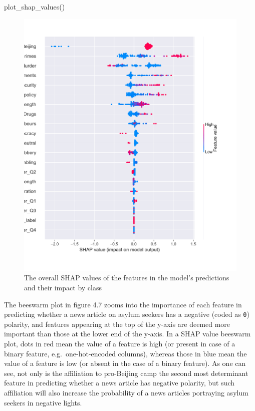 \documentclass[a4paper, oneside]{report}
\newenvironment{Shaded}{\begin{snugshade}}{\end{snugshade}}
\newcommand{\NormalTok}[1]{#1}
\renewenvironment{Shaded}
{
  \vspace{4pt}%
  \begin{snugshade}%
}{%
  \end{snugshade}%
  \vspace{4pt}%
}
\begin{document}
\begin{Shaded}
\begin{Highlighting}[]
\NormalTok{plot\_shap\_values()}
\end{Highlighting}
\end{Shaded}

\begin{figure}
\centering
\includegraphics{versions/Chin_Chapter_4_2022-01-10_files/figure-latex/unnamed-chunk-13-1.pdf}
\caption{The overall SHAP values of the features in the model's
predictions and their impact by class}
\end{figure}

The beeswarm plot in figure 4.7 zooms into the importance of each
feature in predicting whether a news article on asylum seekers has a
negative (coded as \texttt{0}) polarity, and features appearing at the
top of the y-axis are deemed more important than those at the lower end
of the y-axis. In a SHAP value beeswarm plot, dots in red mean the value
of a feature is high (or present in case of a binary feature,
e.g.~one-hot-encoded columns), whereas those in blue mean the value of a
feature is low (or absent in the case of a binary feature). As one can
see, not only is the affiliation to pro-Beijing camp the second most
determinant feature in predicting whether a news article has negative
polarity, but such affiliation will also increase the probability of a
news articles portraying asylum seekers in negative lights.
\end{document}

